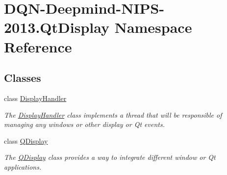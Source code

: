 \hypertarget{namespaceDQN-Deepmind-NIPS-2013_1_1QtDisplay}{}\section{D\+Q\+N-\/\+Deepmind-\/\+N\+I\+P\+S-\/2013.Qt\+Display Namespace Reference}
\label{namespaceDQN-Deepmind-NIPS-2013_1_1QtDisplay}
\subsection*{Classes}
\begin{DoxyCompactItemize}
\item 
class \hyperlink{classDQN-Deepmind-NIPS-2013_1_1QtDisplay_1_1DisplayHandler}{Display\+Handler}
\begin{DoxyCompactList}\small\item\em The \hyperlink{classDQN-Deepmind-NIPS-2013_1_1QtDisplay_1_1DisplayHandler}{Display\+Handler} class implements a thread that will be responsible of managing any windows or other display or Qt events. \end{DoxyCompactList}\item 
class \hyperlink{classDQN-Deepmind-NIPS-2013_1_1QtDisplay_1_1QDisplay}{Q\+Display}
\begin{DoxyCompactList}\small\item\em The \hyperlink{classDQN-Deepmind-NIPS-2013_1_1QtDisplay_1_1QDisplay}{Q\+Display} class provides a way to integrate different window or Qt applications. \end{DoxyCompactList}\end{DoxyCompactItemize}
